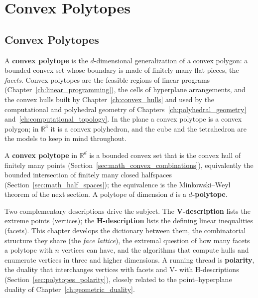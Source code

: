 \chapter{Convex Polytopes}
\label{ch:convex_polytopes}

\section{Convex Polytopes}
\label{sec:polytopes_intro}

A \textbf{convex polytope} is the $d$-dimensional
generalization of a convex polygon: a bounded convex set whose boundary is
made of finitely many flat pieces, the \emph{facets}. Convex polytopes are
the feasible regions of linear programs (Chapter~\ref{ch:linear_programming}),
the cells of hyperplane arrangements, and the convex hulls built by
Chapter~\ref{ch:convex_hulls} and used by the computational and polyhedral
geometry of Chapters~\ref{ch:polyhedral_geometry}
and~\ref{ch:computational_topology}. In the plane a convex polytope is a
convex polygon; in $\mathbb{R}^3$ it is a convex polyhedron, and the cube
and the tetrahedron are the models to keep in mind throughout.

\begin{definition}[Polytope]\label{def:polytopes_polytope}
  A \textbf{convex polytope} in $\mathbb{R}^d$ is a bounded convex set that
  is the convex hull of finitely many points
  (Section~\ref{sec:math_convex_combinations}), equivalently the bounded
  intersection of finitely many closed halfspaces
  (Section~\ref{sec:math_half_spaces}); the equivalence is the
  Minkowski--Weyl theorem of the next section. A polytope of dimension $d$
  is a \textbf{$d$-polytope}.
\end{definition}

Two complementary descriptions drive the subject. The \textbf{V-description}
lists the extreme points (vertices); the \textbf{H-description} lists the
defining linear inequalities (facets). This chapter develops the dictionary
between them, the combinatorial structure they share (the \emph{face
lattice}), the extremal question of how many facets a polytope with $n$
vertices can have, and the algorithms that compute hulls and enumerate
vertices in three and higher dimensions. A running thread is
\textbf{polarity}, the duality that interchanges vertices with facets and
V- with H-descriptions (Section~\ref{sec:polytopes_polarity}), closely
related to the point--hyperplane duality of Chapter~\ref{ch:geometric_duality}.


